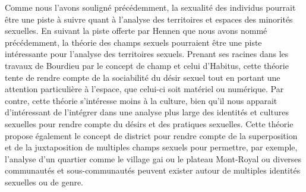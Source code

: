 Comme nous l'avons souligné précédemment, la sexualité des individus pourrait être une piste à suivre quant à l'analyse des territoires et espaces des minorités sexuelles.
En suivant la piste offerte par Hennen que nous avons nommé précédemment, la théorie des champs sexuels pourraient être une piste intéressante pour l'analyse des territoires sexuels.
Prenant ses racines dans les travaux de Bourdieu par le concept de champ et celui d'Habitus, cette théorie tente de rendre compte de la sociabilité du désir sexuel tout en portant une attention particulière à l'espace, que celui-ci soit matériel ou numérique.
Par contre, cette théorie s'intéresse moins à la culture, bien qu'il nous apparait d'intéressant de l'intégrer dans une analyse plus large des identités et cultures sexuelles pour rendre compte du désirs et des pratiques sexuelles.
Cette théorie propose également le concept de district pour rendre compte de la superposition et de la juxtaposition de multiples champs sexuels pour permettre, par exemple, l'analyse d'un quartier comme le village gai ou le plateau Mont-Royal ou diverses communautés et sous-communautés peuvent exister autour de multiples identités sexuelles ou de genre.


